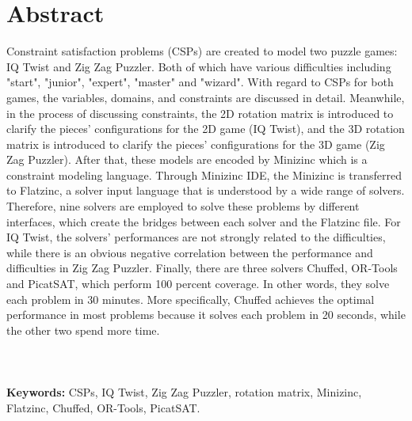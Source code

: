 \chapter*{Abstract}
\vspace{-1em}
Constraint satisfaction problems (CSPs) are created to model two puzzle games: IQ Twist and Zig Zag Puzzler. Both of which have various difficulties including "start", "junior", "expert", "master" and "wizard". With regard to CSPs for both games, the variables, domains, and constraints are discussed in detail. Meanwhile, in the process of discussing constraints, the 2D rotation matrix is introduced to clarify the pieces' configurations for the 2D game (IQ Twist), and the 3D rotation matrix is introduced to clarify the pieces' configurations for the 3D game (Zig Zag Puzzler). After that, these models are encoded by Minizinc which is a constraint modeling language. Through Minizinc IDE, the Minizinc is transferred to Flatzinc, a solver input language that is understood by a wide range of solvers. Therefore, nine solvers are employed to solve these problems by different interfaces, which create the bridges between each solver and the Flatzinc file. For IQ Twist, the solvers' performances are not strongly related to the difficulties, while there is an obvious negative correlation between the performance and difficulties in Zig Zag Puzzler. Finally, there are three solvers Chuffed, OR-Tools and PicatSAT, which perform 100 percent coverage. In other words,  they solve each problem in 30 minutes. More specifically, Chuffed achieves the optimal performance in most problems because it solves each problem in 20 seconds, while the other two spend more time.
\\
\\
\\
\\\textbf{Keywords:} CSPs, IQ Twist, Zig Zag Puzzler, rotation matrix, Minizinc, Flatzinc, Chuffed, OR-Tools, PicatSAT.


